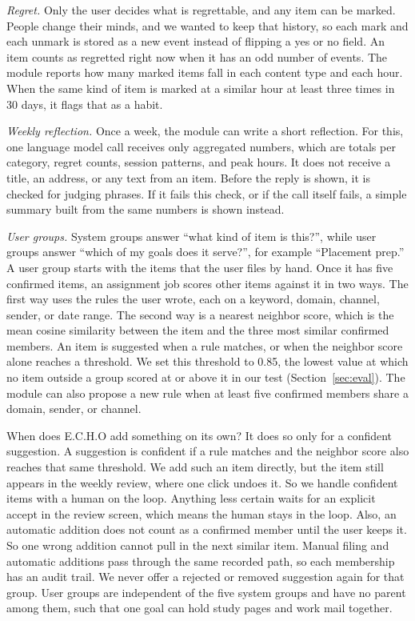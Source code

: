 \documentclass[conference]{IEEEtran}
\begin{document}
\textit{Regret.} Only the user decides what is regrettable, and any item can be marked. People change their minds, and we wanted to keep that history, so each mark and each unmark is stored as a new event instead of flipping a yes or no field. An item counts as regretted right now when it has an odd number of events. The module reports how many marked items fall in each content type and each hour. When the same kind of item is marked at a similar hour at least three times in 30 days, it flags that as a habit.

\textit{Weekly reflection.} Once a week, the module can write a short reflection. For this, one language model call receives only aggregated numbers, which are totals per category, regret counts, session patterns, and peak hours. It does not receive a title, an address, or any text from an item. Before the reply is shown, it is checked for judging phrases. If it fails this check, or if the call itself fails, a simple summary built from the same numbers is shown instead.

\textit{User groups.} System groups answer ``what kind of item is this?'', while user groups answer ``which of my goals does it serve?'', for example ``Placement prep.'' A user group starts with the items that the user files by hand. Once it has five confirmed items, an assignment job scores other items against it in two ways. The first way uses the rules the user wrote, each on a keyword, domain, channel, sender, or date range. The second way is a nearest neighbor score, which is the mean cosine similarity between the item and the three most similar confirmed members. An item is suggested when a rule matches, or when the neighbor score alone reaches a threshold. We set this threshold to 0.85, the lowest value at which no item outside a group scored at or above it in our test (Section~\ref{sec:eval}). The module can also propose a new rule when at least five confirmed members share a domain, sender, or channel.

When does E.C.H.O add something on its own? It does so only for a confident suggestion. A suggestion is confident if a rule matches and the neighbor score also reaches that same threshold. We add such an item directly, but the item still appears in the weekly review, where one click undoes it. So we handle confident items with a human on the loop. Anything less certain waits for an explicit accept in the review screen, which means the human stays in the loop. Also, an automatic addition does not count as a confirmed member until the user keeps it. So one wrong addition cannot pull in the next similar item. Manual filing and automatic additions pass through the same recorded path, so each membership has an audit trail. We never offer a rejected or removed suggestion again for that group. User groups are independent of the five system groups and have no parent among them, such that one goal can hold study pages and work mail together.
\end{document}
